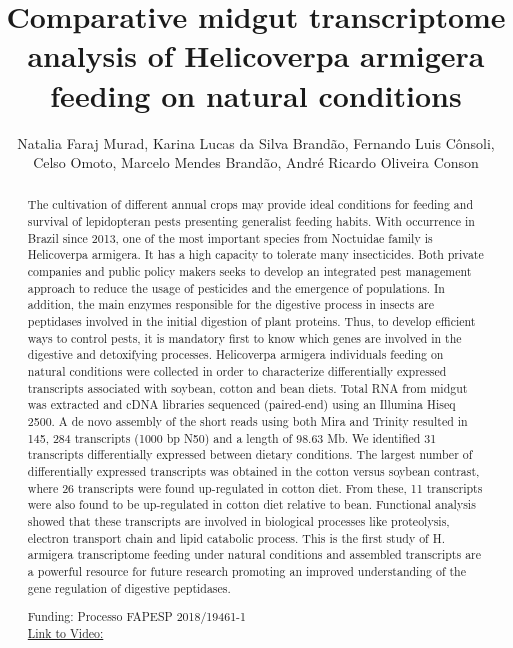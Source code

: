 \documentclass[twoside]{article}
\title{\vspace{-15mm}\fontsize{24pt}{10pt}\selectfont\textbf{ Comparative midgut transcriptome analysis of Helicoverpa armigera feeding on natural conditions }} %
\author{ Natalia Faraj Murad,  Karina Lucas da Silva Brand\~ao,  Fernando Luis C\^onsoli,  Celso Omoto,  Marcelo Mendes Brand\~ao,  Andr\'e Ricardo Oliveira Conson }
\affil{ CBMEG/UNICAMP,  UNIVERSIDADE ESTADUAL DE CAMPINAS,  UNIVERSIDADE ESTADUAL DE CAMPINAS }
\date{}
\begin{document}
  
  
  \maketitle %
  
  
  \thispagestyle{fancy} %
  
  
  \begin{abstract}
  The cultivation of different annual crops may provide ideal conditions for feeding and survival of lepidopteran pests presenting generalist feeding habits. With occurrence in Brazil since 2013,  one of the most important species from Noctuidae family is Helicoverpa armigera. It has a high capacity to tolerate many insecticides. Both private companies and public policy makers seeks to develop an integrated pest management approach to reduce the usage of pesticides and the emergence of populations. In addition,  the main enzymes responsible for the digestive process in insects are peptidases involved in the initial digestion of plant proteins. Thus,  to develop efficient ways to control pests,  it is mandatory first to know which genes are involved in the digestive and detoxifying processes. Helicoverpa armigera individuals feeding on natural conditions were collected in order to characterize differentially expressed transcripts associated with soybean,  cotton and bean diets. Total RNA from midgut was extracted and cDNA libraries sequenced (paired-end) using an Illumina Hiseq 2500. A de novo assembly of the short reads using both Mira and Trinity resulted in 145, 284 transcripts (1000 bp N50) and a length of 98.63 Mb. We identified 31 transcripts differentially expressed between dietary conditions. The largest number of differentially expressed transcripts was obtained in the cotton versus soybean contrast,  where 26 transcripts were found up-regulated in cotton diet. From these,  11 transcripts were also found to be up-regulated in cotton diet relative to bean. Functional analysis showed that these transcripts are involved in biological processes like proteolysis,  electron transport chain and lipid catabolic process. This is the first study of H. armigera transcriptome feeding under natural conditions and assembled transcripts are a powerful resource for future research promoting an improved understanding of the gene regulation of digestive peptidases.
  
  Funding: Processo FAPESP 2018/19461-1 \\
  \href{http://ab3c.org.br/xpress_pres2020/xmxp2020-303096.html}{Link to Video:}

  \end{abstract}
   
  
\end{document}
